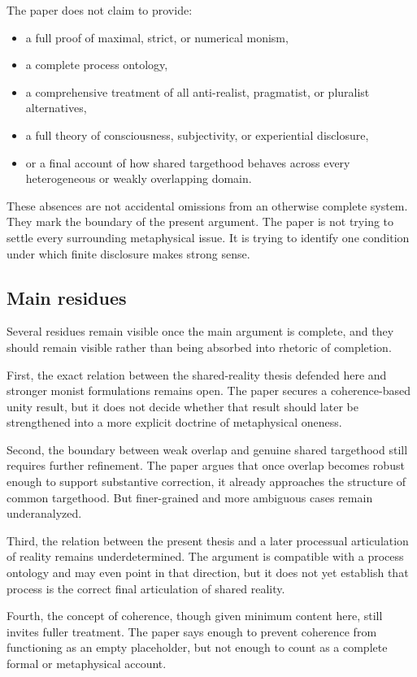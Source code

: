 \documentclass[11pt]{article}
\begin{document}
The paper does not claim to provide:
\begin{itemize}
    \item a full proof of maximal, strict, or numerical monism,
    \item a complete process ontology,
    \item a comprehensive treatment of all anti-realist, pragmatist, or pluralist alternatives,
    \item a full theory of consciousness, subjectivity, or experiential disclosure,
    \item or a final account of how shared targethood behaves across every heterogeneous or weakly overlapping domain.
\end{itemize}

These absences are not accidental omissions from an otherwise complete system. They mark the boundary of the present argument. The paper is not trying to settle every surrounding metaphysical issue. It is trying to identify one condition under which finite disclosure makes strong sense.

\subsection{Main residues}

Several residues remain visible once the main argument is complete, and they should remain visible rather than being absorbed into rhetoric of completion.

First, the exact relation between the shared-reality thesis defended here and stronger monist formulations remains open. The paper secures a coherence-based unity result, but it does not decide whether that result should later be strengthened into a more explicit doctrine of metaphysical oneness.

Second, the boundary between weak overlap and genuine shared targethood still requires further refinement. The paper argues that once overlap becomes robust enough to support substantive correction, it already approaches the structure of common targethood. But finer-grained and more ambiguous cases remain underanalyzed.

Third, the relation between the present thesis and a later processual articulation of reality remains underdetermined. The argument is compatible with a process ontology and may even point in that direction, but it does not yet establish that process is the correct final articulation of shared reality.

Fourth, the concept of coherence, though given minimum content here, still invites fuller treatment. The paper says enough to prevent coherence from functioning as an empty placeholder, but not enough to count as a complete formal or metaphysical account.
\end{document}
